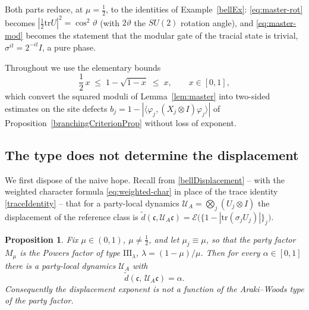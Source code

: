 \documentclass[twoside,11pt,letter]{article}
\def\cU{{\mathcal{U}}}
\def\fc{{\mathfrak{c}}}
\newcommand{\tr}{\mathrm{tr}}
\newcommand{\cexp}{\mathcal{E}}  %
\theoremstyle{definition}
\theoremstyle{definition}
\theoremstyle{plain}
\newtheorem{proposition}[theorem]{Proposition}
\begin{document}
Both parts reduce, at $\mu = \tfrac12$, to the identities of Example~\ref{bellEx}: \eqref{eq:master-rot} becomes $|\tfrac12 \tr U|^2 = \cos^2 \vartheta$ (with $2\vartheta$ the $SU(2)$ rotation angle), and \eqref{eq:master-mod} becomes the statement that the modular gate of the tracial state is trivial, $\sigma^{it} = 2^{-it} I$, a pure phase.

Throughout we use the elementary bounds
\begin{equation}
\label{eq:sqrt-bounds}
\frac12\, x \;\le\; 1 - \sqrt{1-x} \;\le\; x,
\qquad x \in [0,1],
\end{equation}
which convert the squared moduli of Lemma~\ref{lem:master} into two-sided estimates on the site defects $b_j = 1 - |\langle \varphi_j, (X_j \otimes I) \varphi_j\rangle|$ of Proposition~\ref{branchingCriterionProp} without loss of exponent.

\subsection{The type does not determine the displacement}
\label{sec:AW-neg}

We first dispose of the naive hope. Recall from \eqref{bellDisplacement} -- with the weighted character formula \eqref{eq:weighted-char} in place of the trace identity \eqref{traceIdentity} -- that for a party-local dynamics $\cU_A = \bigotimes_j (U_j \otimes I)$ the displacement of the reference class is $\tilde d(\fc, \cU_A\fc) = \cexp\bigl( \{ 1 - |\tr(\sigma_j U_j)| \}_j \bigr)$.

\begin{proposition}
\label{prop:AW-neg}
Fix $\mu \in (0,1)$, $\mu \neq \tfrac12$, and let $\mu_j \equiv \mu$, so that the party factor $M_\mu$ is the Powers factor of type $\mathrm{III}_\lambda$, $\lambda = (1-\mu)/\mu$. Then for every $\alpha \in [0,1]$ there is a party-local dynamics $\cU_A$ with
\begin{equation*}
\tilde d (\fc,\, \cU_A\fc )= \alpha .
\end{equation*}
Consequently the displacement exponent is not a function of the Araki--Woods type of the party factor.
\end{proposition}
\end{document}
